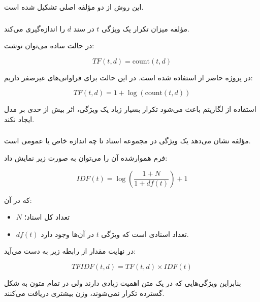 \documentclass[12pt,a4paper,oneside]{report}
\begin{document}
این روش از دو مؤلفه اصلی تشکیل شده است.


\subsubsection{}

مؤلفه
میزان تکرار یک ویژگی $t$ در سند $d$ را اندازه‌گیری می‌کند.

در حالت ساده می‌توان نوشت:

\begin{equation}
TF(t,d)=\mathrm{count}(t,d)
\end{equation}

در پروژه حاضر از
استفاده شده است. در این حالت برای فراوانی‌های غیرصفر داریم:

\begin{equation}
TF(t,d)=1+\log(\mathrm{count}(t,d))
\end{equation}

استفاده از لگاریتم باعث می‌شود تکرار بسیار زیاد یک ویژگی، اثر بیش از حدی بر مدل ایجاد نکند.


\subsubsection{}

مؤلفه
نشان می‌دهد یک ویژگی در مجموعه اسناد تا چه اندازه خاص یا عمومی است.

فرم هموارشده آن را می‌توان به صورت زیر نمایش داد:

\begin{equation}
IDF(t)
=
\log
\left(
\frac{1+N}{1+df(t)}
\right)
+1
\end{equation}

که در آن:

\begin{itemize}
	\item $N$ تعداد کل اسناد؛
	\item $df(t)$ تعداد اسنادی است که ویژگی $t$ در آن‌ها وجود دارد.
\end{itemize}

در نهایت مقدار
از رابطه زیر به دست می‌آید:

\begin{equation}
TFIDF(t,d)
=
TF(t,d)
\times
IDF(t)
\end{equation}

بنابراین ویژگی‌هایی که در یک متن اهمیت زیادی دارند ولی در تمام متون به شکل گسترده تکرار نمی‌شوند، وزن بیشتری دریافت می‌کنند.
\end{document}
